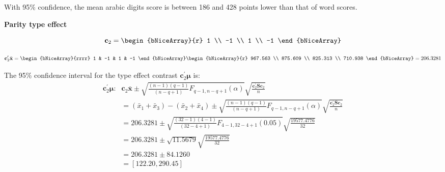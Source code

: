 \begin{enumerate}[label= (\alph*)]
    With 95\% confidence, the mean arabic digits score is between 186 and 428 points lower than that of word scores.

    \textbf{Parity type effect}
  
    \[
        \textbf{c}_{2}
        =
        \begin{bNiceArray}{r}
             1 \\
            -1 \\
             1 \\
            -1
        \end{bNiceArray}
    \]

    \[
        \textbf{c}_{2}^{\prime} 
        \bar{\textbf{x}}
        =
        \begin{bNiceArray}{rrrr}
            1 & -1 & 1 & -1
        \end{bNiceArray}
        \begin{bNiceArray}{r}
            967.563 \\
            875.609 \\
            825.313 \\
            710.938
        \end{bNiceArray}
        =
        206.3281
    \]
 
    The 95\% confidence interval for the type effect contrast 
    $\textbf{c}_{2}^{\prime}\bm{\mu}$ is:
    \begin{align*}
         \textbf{c}_{2}^{\prime}\bm{\mu}\text{:}
         &
        \textbf{c}_{2}\bar{\textbf{x}}
        \pm
        \sqrt{
            \frac{(n-1)(q-1)}{(n-q+1)}
            F_{q-1, n-q+1}\left(\alpha\right)
        }
        \sqrt{
            \frac{\textbf{c}_{2}^{\prime}\textbf{S}\textbf{c}_{2}}{n}
        }
        \\
        & =
        \left(\bar{x}_{1} + \bar{x}_{3}\right)
        -
        \left(\bar{x}_{2} + \bar{x}_{4}\right)
        \pm
        \sqrt{
            \frac{(n-1)(q-1)}{(n-q+1)}
            F_{q-1, n-q+1}\left(\alpha\right)
        }
        \sqrt{
            \frac{\textbf{c}_{2}^{\prime}\textbf{S}\textbf{c}_{2}}{n}
        }
        \\
        & =
        206.3281
        \pm
        \sqrt{
            \frac{(32-1)(4-1)}{(32-4+1)}
            F_{4-1, 32-4+1}(0.05)
        }
        \sqrt{
            \frac{19577.4776}{32}
        }
        \\
        & =
        206.3281
        \pm
        \sqrt{11.5679}
        \sqrt{
            \frac{19577.4776}{32}
        }
        \\
        & =
        206.3281
        \pm
        84.1260
        \\
        & =
        \left[122.20, 290.45\right]
    \end{align*}
   

\end{enumerate}
